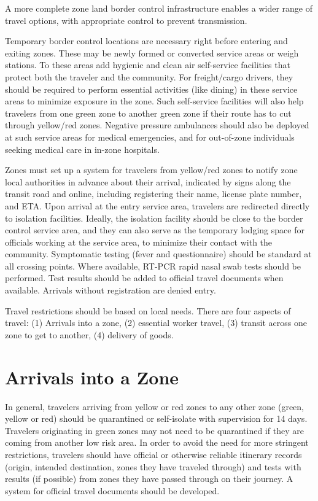 \documentclass[onecolumn,journal]{IEEEtran}
\begin{document}
\begin{multicols}{2}
A more complete zone land border control infrastructure enables a wider range of travel options, with appropriate control to prevent transmission.

Temporary border control locations are necessary right before entering and exiting zones. These may be newly formed or converted service areas or weigh stations. To these areas add hygienic and clean air self-service facilities that protect both the traveler and the community. For freight/cargo drivers, they should be required to perform essential activities (like dining) in these service areas to minimize exposure in the zone. Such self-service facilities will also help travelers from one green zone to another green zone if their route has to cut through yellow/red zones. Negative pressure ambulances should also be deployed at such service areas for medical emergencies, and for out-of-zone individuals seeking medical care in in-zone hospitals. 

Zones must set up a system for travelers from yellow/red zones to notify zone local authorities in advance about their arrival, indicated by signs along the transit road and online, including registering their name, license plate number, and ETA. Upon arrival at the entry service area, travelers are redirected directly to isolation facilities. Ideally, the isolation facility should be close to the border control service area, and they can also serve as the temporary lodging space for officials working at the service area, to minimize their contact with the community. Symptomatic testing (fever and questionnaire) should be standard at all crossing points. Where available, RT-PCR rapid nasal swab tests should be performed. Test results should be added to official travel documents when available. Arrivals without registration are denied entry.

Travel restrictions should be based on local needs. There are four aspects of travel: (1) Arrivals into a zone, (2) essential worker travel, (3) transit across one zone to get to another, (4) delivery of goods.  

\section{Arrivals into a Zone}

In general, travelers arriving from yellow or red zones to any other zone (green, yellow or red) should be quarantined or self-isolate with supervision for 14 days. Travelers originating in green zones may not need to be quarantined if they are coming from another low risk area. In order to avoid the need for more stringent restrictions, travelers should have official or otherwise reliable itinerary records (origin, intended destination, zones they have traveled through) and tests with results (if possible) from zones they have passed through on their journey. A system for official travel documents should be developed. 


\end{multicols}
\end{document}

